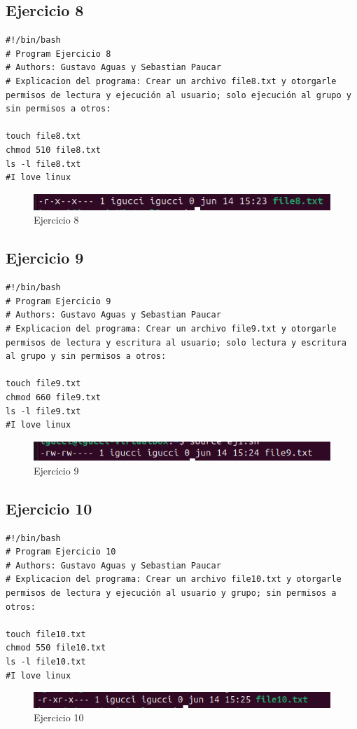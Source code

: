 \documentclass[11pt,twoside]{book}
\begin{document}
\subsection{Ejercicio 8}
\begin{lstlisting}
#!/bin/bash
# Program Ejercicio 8
# Authors: Gustavo Aguas y Sebastian Paucar
# Explicacion del programa: Crear un archivo file8.txt y otorgarle permisos de lectura y ejecución al usuario; solo ejecución al grupo y sin permisos a otros:

touch file8.txt
chmod 510 file8.txt
ls -l file8.txt
#I love linux
\end{lstlisting}
\begin{figure}[h]
    \centering
    \includegraphics[width=1\linewidth]{pnum/ej8.png}
    \caption{Ejercicio 8}
\end{figure}

\subsection{Ejercicio 9}
\begin{lstlisting}
#!/bin/bash
# Program Ejercicio 9
# Authors: Gustavo Aguas y Sebastian Paucar
# Explicacion del programa: Crear un archivo file9.txt y otorgarle permisos de lectura y escritura al usuario; solo lectura y escritura al grupo y sin permisos a otros:

touch file9.txt
chmod 660 file9.txt
ls -l file9.txt
#I love linux
\end{lstlisting}
\begin{figure}[h]
    \centering
    \includegraphics[width=1\linewidth]{pnum/ej9.png}
    \caption{Ejercicio 9}
\end{figure}
\newpage
\subsection{Ejercicio 10}
\begin{lstlisting}
#!/bin/bash
# Program Ejercicio 10
# Authors: Gustavo Aguas y Sebastian Paucar
# Explicacion del programa: Crear un archivo file10.txt y otorgarle permisos de lectura y ejecución al usuario y grupo; sin permisos a otros:

touch file10.txt
chmod 550 file10.txt
ls -l file10.txt
#I love linux
\end{lstlisting}
\begin{figure}[h]
    \centering
    \includegraphics[width=1\linewidth]{pnum/ej10.png}
    \caption{Ejercicio 10}
\end{figure}
\newpage
\end{document}
